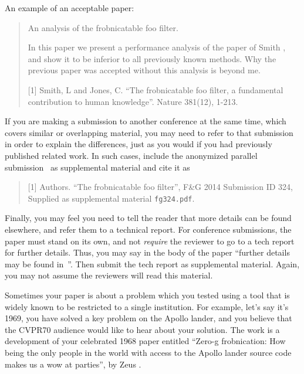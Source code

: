 \documentclass[10pt,twocolumn,letterpaper]{article}
\begin{document}
An example of an acceptable paper:
\begin{quote}
\begin{center}
     An analysis of the frobnicatable foo filter.
\end{center}

   In this paper we present a performance analysis of the  paper of Smith \etal [1], and show it to be inferior to all previously known methods.
   Why the previous paper was accepted without this analysis is beyond me.

   [1] Smith, L and Jones, C. ``The frobnicatable foo filter, a fundamental contribution to human knowledge''. Nature 381(12), 1-213.
\end{quote}

If you are making a submission to another conference at the same time, which covers similar or overlapping material, you may need to refer to that submission in order to explain the differences, just as you would if you had previously published related work.
In such cases, include the anonymized parallel submission~\cite{Authors14} as supplemental material and cite it as
\begin{quote}
[1] Authors. ``The frobnicatable foo filter'', F\&G 2014 Submission ID 324, Supplied as supplemental material {\tt fg324.pdf}.
\end{quote}

Finally, you may feel you need to tell the reader that more details can be found elsewhere, and refer them to a technical report.
For conference submissions, the paper must stand on its own, and not {\em require} the reviewer to go to a tech report for further details.
Thus, you may say in the body of the paper ``further details may be found in~\cite{Authors14b}''.
Then submit the tech report as supplemental material.
Again, you may not assume the reviewers will read this material.

Sometimes your paper is about a problem which you tested using a tool that is widely known to be restricted to a single institution.
For example, let's say it's 1969, you have solved a key problem on the Apollo lander, and you believe that the CVPR70 audience would like to hear about your
solution.
The work is a development of your celebrated 1968 paper entitled ``Zero-g frobnication: How being the only people in the world with access to the Apollo lander source code makes us a wow at parties'', by Zeus \etal.
\end{document}
